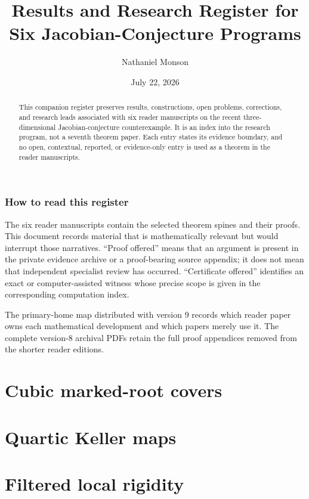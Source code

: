\documentclass[11pt]{amsart}
\title[Results and Research Register]
{Results and Research Register for Six Jacobian-Conjecture Programs}
\author{Nathaniel Monson}
\date{July 22, 2026}
\begin{document}
\begin{abstract}
This companion register preserves results, constructions, open problems,
corrections, and research leads associated with six reader manuscripts on
the recent three-dimensional Jacobian-conjecture counterexample.  It is an
index into the research program, not a seventh theorem paper.  Each entry
states its evidence boundary, and no open, contextual, reported, or
evidence-only entry is used as a theorem in the reader manuscripts.
\end{abstract}

\maketitle

\section{How to read this register}

The six reader manuscripts contain the selected theorem spines and their
proofs.  This document records material that is mathematically relevant but
would interrupt those narratives.  ``Proof offered'' means that an argument
is present in the private evidence archive or a proof-bearing source
appendix; it does not mean that independent specialist review has occurred.
``Certificate offered'' identifies an exact or computer-assisted witness
whose precise scope is given in the corresponding computation index.

The primary-home map distributed with version 9 records which reader paper
owns each mathematical development and which papers merely use it.  The
complete version-8 archival PDFs retain the full proof appendices removed
from the shorter reader editions.

\part{Cubic marked-root covers}


\part{Quartic Keller maps}


\part{Filtered local rigidity}

\end{document}
